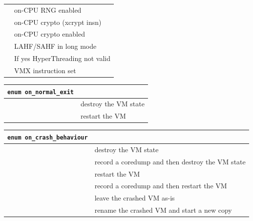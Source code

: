 \begin{longtable}{|ll|}
\hspace{0.5cm}{\tt XSTORE\_EN} &  on-CPU RNG enabled  \\
\hspace{0.5cm}{\tt XCRYPT} &  on-CPU crypto (xcrypt insn)  \\
\hspace{0.5cm}{\tt XCRYPT\_EN} &  on-CPU crypto enabled  \\
\hspace{0.5cm}{\tt LAHF\_LM} &  LAHF/SAHF in long mode  \\
\hspace{0.5cm}{\tt CMP\_LEGACY} &  If yes HyperThreading not valid  \\
\hspace{0.5cm}{\tt VMX} &  VMX instruction set  \\
\hline
\end{longtable}

\vspace{1cm}
\begin{longtable}{|ll|}
\hline
{\tt enum on\_normal\_exit} & \\
\hline
\hspace{0.5cm}{\tt destroy} & destroy the VM state \\
\hspace{0.5cm}{\tt restart} & restart the VM \\
\hline
\end{longtable}

\vspace{1cm}
\begin{longtable}{|ll|}
\hline
{\tt enum on\_crash\_behaviour} & \\
\hline
\hspace{0.5cm}{\tt destroy} & destroy the VM state \\
\hspace{0.5cm}{\tt coredump\_and\_destroy} & record a coredump and then destroy the VM state \\
\hspace{0.5cm}{\tt restart} & restart the VM \\
\hspace{0.5cm}{\tt coredump\_and\_restart} & record a coredump and then restart the VM \\
\hspace{0.5cm}{\tt preserve} & leave the crashed VM as-is \\
\hspace{0.5cm}{\tt rename\_restart} & rename the crashed VM and start a new copy \\
\hline
\end{longtable}

